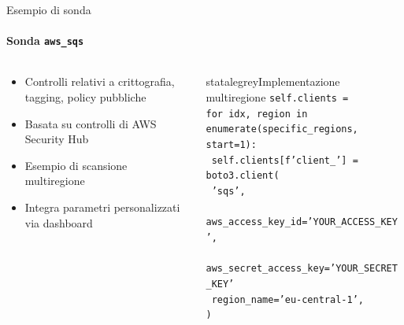\documentclass{beamer}
\begin{document}
\begin{frame}{Esempio di sonda}
    \framesubtitle{Sonda \texttt{aws\_sqs}}
    \begin{columns}
        \begin{column}{0.4\textwidth}
            \begin{itemize}
                \item Controlli relativi a crittografia, tagging, policy pubbliche
                \item Basata su controlli di AWS Security Hub
                \item Esempio di scansione multiregione
                \item Integra parametri personalizzati via dashboard
            \end{itemize}
        \end{column}
        \begin{column}{0.6\textwidth}
            \begin{colorblock}[black]{statalegrey}{Implementazione multiregione}
                \texttt{\textcolor{maincolor}{self}.clients = \string{\string}}\\
                \texttt{\textcolor{maincolor}{for} idx, region in \textcolor{maincolor}{enumerate}(specific\_regions, start=1):}\\
                    \texttt{    \textcolor{maincolor}{self}.clients[\textcolor{statalegreen}{f'client\_'}] = \textcolor{maincolor}{boto3}.client(}\\
                    \texttt{    \textcolor{statalegreen}{'sqs'},}\\
                    \texttt{    aws\_access\_key\_id=\textcolor{statalegreen}{'YOUR\_ACCESS\_KEY'},}\\
                    \texttt{    aws\_secret\_access\_key=\textcolor{statalegreen}{'YOUR\_SECRET\_KEY'}}\\
                    \texttt{    region\_name=\textcolor{statalegreen}{'eu-central-1'},}\\
                    \texttt{)}\\
            \end{colorblock}
        \end{column}
    \end{columns}
\end{frame}
\end{document}
